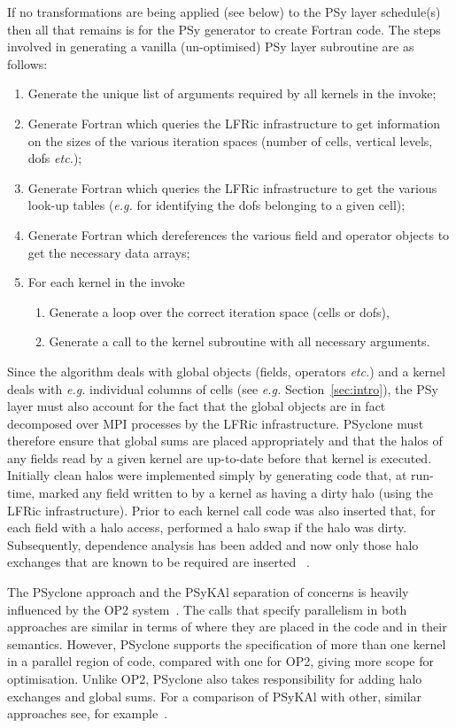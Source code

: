 \documentclass[review,times]{elsarticle}
\begin{document}
If no transformations are being applied (see below) to the PSy layer
schedule(s) then all that remains is for the PSy generator to create
Fortran code.  The steps involved in generating a vanilla
(un-optimised) PSy layer subroutine are as follows:
\begin{enumerate}
\item Generate the unique list of arguments required by all kernels
  in the invoke;
\item Generate Fortran which queries the LFRic infrastructure to get
  information on the sizes of the various iteration spaces (number of cells,
  vertical levels, dofs {\em etc.});
\item Generate Fortran which queries the LFRic infrastructure to get the
  various look-up tables ({\em e.g.} for identifying the dofs belonging to a
  given cell);
\item Generate Fortran which dereferences the various field and operator
  objects to get the necessary data arrays;
\item For each kernel in the invoke
  \begin{enumerate}
    \item Generate a loop over the correct iteration space (cells or dofs),
    \item Generate a call to the kernel subroutine with all necessary arguments.
  \end{enumerate}
\end{enumerate}

Since the algorithm deals with global objects
(fields, operators {\em etc.})  and a kernel deals with {\em e.g.} individual
columns of cells (see {\em e.g.} Section~\ref{sec:intro}), 
the PSy layer must also account for the fact that
the global objects are in fact decomposed over MPI processes by the
LFRic infrastructure. PSyclone must therefore ensure that global sums
are placed appropriately and that the halos of any fields read by a
given kernel are up-to-date before that kernel is executed. Initially
clean halos were implemented simply by generating code that, at
run-time, marked any field written to by a kernel as having a dirty
halo (using the LFRic infrastructure). Prior to each kernel call code
was also inserted that, for each field with a halo access, performed a
halo swap if the halo was dirty. Subsequently, dependence analysis has
been added and now only those halo exchanges that are known to be
required are inserted ~\cite{psyclone}.

The PSyclone approach and the {PS}y{KA}l separation of concerns is
heavily influenced by the OP2 system~\citep{OP2, PYOP2}. The calls
that specify parallelism in both approaches are similar in terms of
where they are placed in the code and in their semantics. However,
PSyclone supports the specification of more than one kernel in a
parallel region of code, compared with one for OP2, giving more scope
for optimisation. Unlike OP2, PSyclone also takes responsibility for
adding halo exchanges and global sums. For a comparison of {PS}y{KA}l
with other, similar approaches see, for example~\cite{nemolite2d_psykal}.
\end{document}
